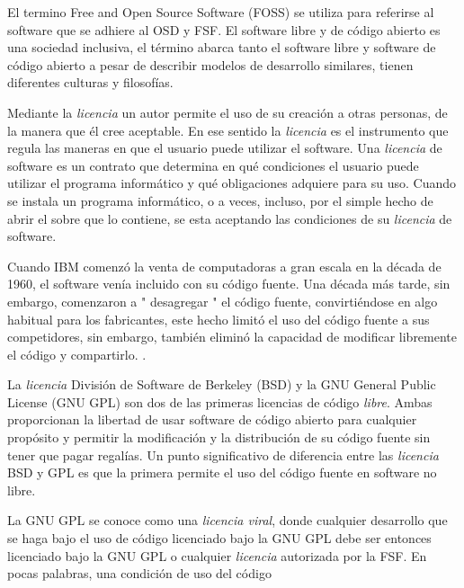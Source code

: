  	\vspace{0.5cm}
	\par
	El termino Free and Open Source Software (FOSS) se utiliza para referirse al software que se adhiere al OSD y FSF. El software libre y de código
	abierto es una sociedad inclusiva, el término abarca tanto el software libre y software de código abierto a pesar de describir modelos de desarrollo
	similares, tienen diferentes culturas y filosofías.
	\vspace{0.5cm}
	\par
	Mediante la \textit{licencia} un autor permite el uso de su creación a otras personas, de la manera que él cree aceptable. En ese sentido
	la \textit{licencia} es el instrumento que regula las maneras en que el usuario puede utilizar el software. Una \textit{licencia} de software es un
	contrato que determina en qué condiciones el usuario puede utilizar el programa informático y qué obligaciones adquiere para su uso. Cuando se
	instala un programa informático, o a veces, incluso, por el simple hecho de abrir el sobre que lo contiene, se esta aceptando las condiciones de su
	\textit{licencia} de software.
	\vspace{0.5cm}
	\par	
	Cuando IBM comenzó la venta de computadoras a gran escala en la década de 1960, el software venía incluido con su código fuente. Una década más
	tarde, sin embargo, comenzaron a " desagregar "  el código fuente, convirtiéndose en algo habitual para los fabricantes, este hecho limitó el uso del
	código fuente a sus competidores, sin embargo, también eliminó la capacidad de modificar libremente el código y compartirlo. \cite{Etiqueta08}.
	\vspace{0.5cm}
	\par	
	La \textit{licencia} División de Software de Berkeley (BSD) y la GNU General Public License (GNU GPL) son dos de las primeras licencias de código
	\textit{libre}. Ambas proporcionan la libertad de usar software de código abierto para cualquier propósito y permitir la modificación y la
	distribución de su código fuente sin tener que pagar regalías. Un punto significativo de diferencia entre las \textit{licencia} BSD y GPL es que la
	primera permite el uso del código fuente en software no libre.
	\vspace{0.5cm}
	\par	
	La GNU GPL se conoce como una \textit{licencia viral}, donde cualquier desarrollo que se haga bajo el uso de código licenciado bajo la GNU GPL debe
	ser entonces licenciado bajo la GNU GPL o cualquier \textit{licencia} autorizada por la FSF. En pocas palabras, una condición de uso del código

